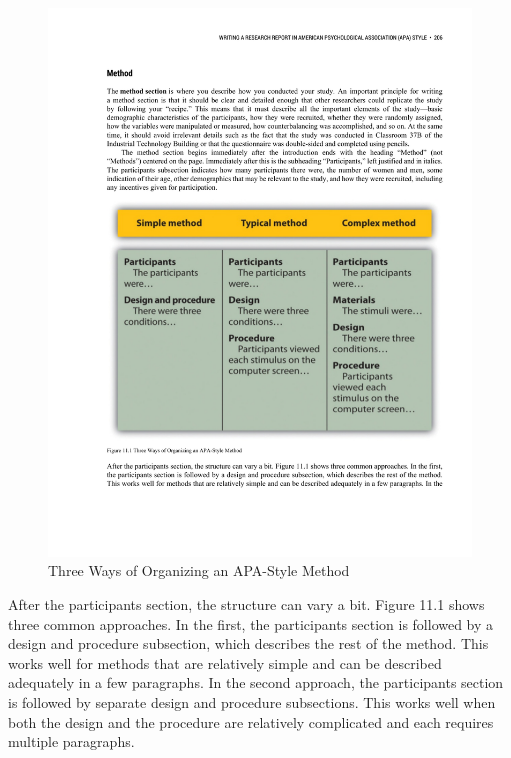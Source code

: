 \begin{figure}

 



\includegraphics[width=\linewidth]{figures/C11methods.pdf}

 



\caption{Three Ways of Organizing an APA-Style Method}

 



\label{fig:method}

 \end{figure}




After the participants section, the structure can vary a bit. Figure 11.1 shows three common approaches. In the first, the participants section is followed by a design and procedure subsection, which describes the rest of the method. This works well for methods that are relatively simple and can be described adequately in a few paragraphs. In the
second approach, the participants section is followed by separate design and procedure subsections. This works well when both the design and the procedure are relatively complicated and each requires multiple paragraphs.




